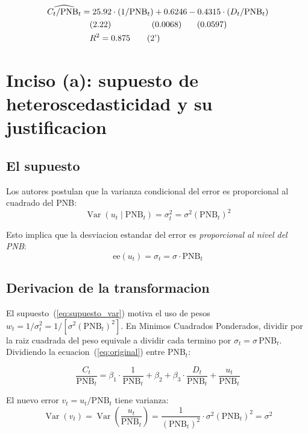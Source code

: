 \documentclass[12pt, letterpaper]{article}
\theoremstyle{remark}
\newcommand{\Var}{\operatorname{Var}}
\begin{document}
\begin{align}
  \widehat{C_t/\text{PNB}_t}
    &= 25.92 \cdot (1/\text{PNB}_t) + 0.6246 - 0.4315 \cdot (D_t/\text{PNB}_t)
  \notag\\
    &\quad (2.22) \qquad\qquad\;\;\; (0.0068) \quad\;\;\; (0.0597)
  \notag\\
    &\quad R^2 = 0.875
  \tag{2'}\label{eq:result2}
\end{align}

\section{Inciso (a): supuesto de heteroscedasticidad y su justificacion}

\subsection{El supuesto}

Los autores postulan que la varianza condicional del error es proporcional
al cuadrado del PNB:
\begin{equation}
  \Var(u_t \mid \text{PNB}_t) = \sigma_t^2 = \sigma^2 (\text{PNB}_t)^2
  \label{eq:supuesto_var}
\end{equation}

Esto implica que la desviacion estandar del error es \emph{proporcional al nivel
del PNB}:
\begin{equation}
  \text{ee}(u_t) = \sigma_t = \sigma \cdot \text{PNB}_t
  \label{eq:desv_estandar}
\end{equation}

\subsection{Derivacion de la transformacion}

El supuesto~(\ref{eq:supuesto_var}) motiva el uso de pesos $w_t = 1/\sigma_t^2 = 1/[\sigma^2(\text{PNB}_t)^2]$.
En Minimos Cuadrados Ponderados, dividir por la raiz cuadrada del peso equivale
a dividir cada termino por $\sigma_t = \sigma\,\text{PNB}_t$. Dividiendo
la ecuacion~(\ref{eq:original}) entre $\text{PNB}_t$:

\begin{equation}
  \frac{C_t}{\text{PNB}_t}
    = \beta_1 \cdot \frac{1}{\text{PNB}_t}
    + \beta_2
    + \beta_3 \cdot \frac{D_t}{\text{PNB}_t}
    + \frac{u_t}{\text{PNB}_t}
  \label{eq:derivacion}
\end{equation}

El nuevo error $v_t = u_t/\text{PNB}_t$ tiene varianza:
\begin{equation}
  \Var(v_t)
    = \Var\!\left(\frac{u_t}{\text{PNB}_t}\right)
    = \frac{1}{(\text{PNB}_t)^2} \cdot \sigma^2 (\text{PNB}_t)^2
    = \sigma^2
  \label{eq:var_vt}
\end{equation}
\end{document}
